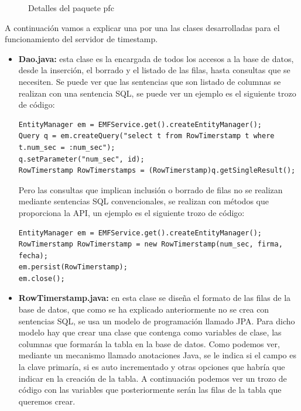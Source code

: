 \begin{figure}
  \caption{Detalles del paquete pfc}
  \label{fig:paquete_pfc}
\end{figure}

A continuación vamos a explicar una por una las clases desarrolladas para el funcionamiento del servidor de timestamp.

\begin{itemize}

\item \textbf{Dao.java:} esta clase es la encargada de todos los accesos a la base de datos, desde la inserción, el borrado y el listado de las filas, hasta consultas que se necesiten. Se puede ver que las sentencias que son listado de columnas se realizan con una sentencia SQL, se puede ver un ejemplo es el siguiente trozo de código:

\begin{lstlisting}[style=Java]
EntityManager em = EMFService.get().createEntityManager();
Query q = em.createQuery("select t from RowTimerstamp t where t.num_sec = :num_sec");
q.setParameter("num_sec", id);
RowTimerstamp RowTimerstamps = (RowTimerstamp)q.getSingleResult();
\end{lstlisting}

Pero las consultas que implican inclusión o borrado de filas no se realizan mediante sentencias SQL convencionales, se realizan con métodos que proporciona la API, un ejemplo es el siguiente trozo de código:

\begin{lstlisting}[style=Java]
EntityManager em = EMFService.get().createEntityManager();
RowTimerstamp RowTimerstamp = new RowTimerstamp(num_sec, firma, fecha);
em.persist(RowTimerstamp);
em.close();
\end{lstlisting}

\item \textbf{RowTimerstamp.java:} en esta clase se diseña el formato de las filas de la base de datos, que como se ha explicado anteriormente no se crea con sentencias SQL, se usa un modelo de programación llamado JPA. Para dicho modelo hay que crear una clase que contenga como variables de clase, las columnas que formarán la tabla en la base de datos. Como podemos ver, mediante un mecanismo llamado anotaciones Java, se le indica si el campo es la clave primaría, si es auto incrementado y otras opciones que habría que indicar en la creación de la tabla. A continuación podemos ver un trozo de código con las variables que posteriormente serán las filas de la tabla que queremos crear.  


\end{itemize}
